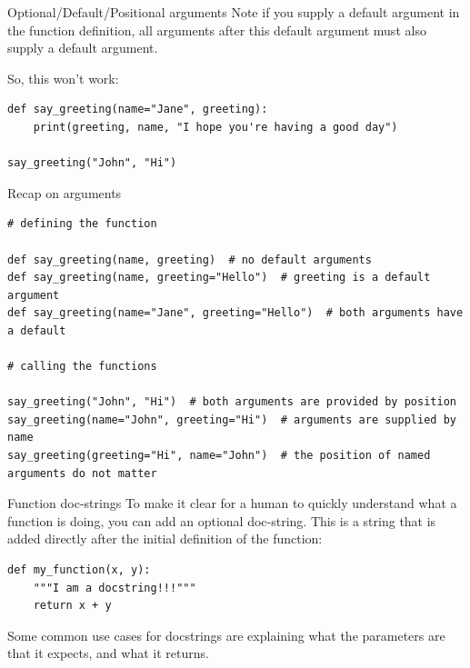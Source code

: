 \documentclass[10pt]{beamer}
\begin{document}
\begin{frame}[label={sec:orgca17e6d},fragile]{Optional/Default/Positional arguments}
 \alert{Note} if you supply a default argument in the function definition, all arguments after
this default argument must also supply a default argument.

So, this \alert{won't} work:

\begin{verbatim}
def say_greeting(name="Jane", greeting):
    print(greeting, name, "I hope you're having a good day")

say_greeting("John", "Hi")
\end{verbatim}
\end{frame}

\begin{frame}[label={sec:org75be2a0},fragile]{Recap on arguments}
 \begin{verbatim}
# defining the function

def say_greeting(name, greeting)  # no default arguments
def say_greeting(name, greeting="Hello")  # greeting is a default argument
def say_greeting(name="Jane", greeting="Hello")  # both arguments have a default

# calling the functions

say_greeting("John", "Hi")  # both arguments are provided by position
say_greeting(name="John", greeting="Hi")  # arguments are supplied by name
say_greeting(greeting="Hi", name="John")  # the position of named arguments do not matter
\end{verbatim}
\end{frame}

\begin{frame}[label={sec:org7679181},fragile]{Function doc-strings}
 To make it clear for a human to quickly understand what a function is doing, you can
add an optional doc-string. This is a string that is added directly after the initial
definition of the function:

\begin{verbatim}
def my_function(x, y):
    """I am a docstring!!!"""
    return x + y
\end{verbatim}

Some common use cases for docstrings are explaining what the parameters are that it
expects, and what it returns.
\end{frame}
\end{document}
